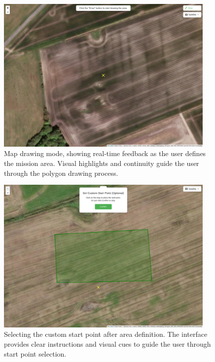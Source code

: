 \begin{figure}[H]
    \centering
    \includegraphics[width=0.95\textwidth]{7. Figures/Frontend/frontend-map-1.png}
    \caption{Map drawing mode, showing real-time feedback as the user defines the mission area. Visual highlights and continuity guide the user through the polygon drawing process.}
    \label{fig:frontend-map-draw}
\end{figure}

\begin{figure}[H]
    \centering
    \includegraphics[width=0.95\textwidth]{7. Figures/Frontend/frontend-map-2.png}
    \caption{Selecting the custom start point after area definition. The interface provides clear instructions and visual cues to guide the user through start point selection.}
    \label{fig:frontend-map-setstart}
\end{figure}

